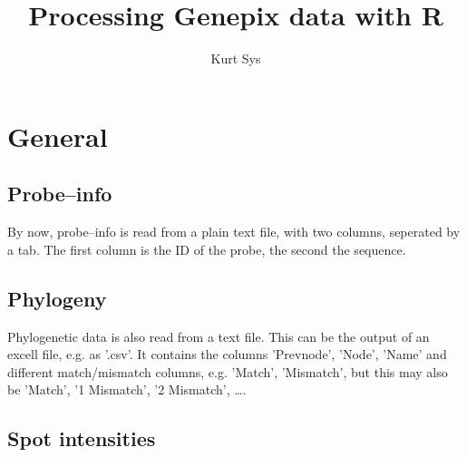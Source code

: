 \documentclass[english,widemargin]{article}
\begin{document}
\title{Processing Genepix data with R}
\author{Kurt Sys}
\maketitle


\section{General}



\subsection{Probe--info}

By now, probe--info is read from a plain text file, with two columns, seperated by a tab. The first column is the ID of the probe, the second the sequence.



\subsection{Phylogeny}

Phylogenetic data is also read from a text file. This can be the output of an excell file, e.g. as '.csv'. It contains the columns 'Prevnode', 'Node', 'Name' and different match/mismatch columns, e.g. 'Match', 'Mismatch', but this may also be 'Match', '1 Mismatch', '2 Mismatch', \ldots.



\subsection{Spot intensities}

\end{document}
